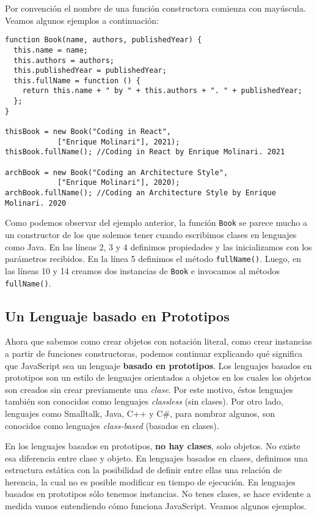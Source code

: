 \documentclass[a4paper, oneside, titlepage, 12pt]{paper}
\begin{document}
Por convención el nombre de una función constructora comienza con mayúscula. Veamos algunos ejemplos a continuación:

\begin{verbatim}
function Book(name, authors, publishedYear) {
  this.name = name;
  this.authors = authors;
  this.publishedYear = publishedYear;
  this.fullName = function () {
    return this.name + " by " + this.authors + ". " + publishedYear;
  };
}

thisBook = new Book("Coding in React", 
			["Enrique Molinari"], 2021);
thisBook.fullName(); //Coding in React by Enrique Molinari. 2021

archBook = new Book("Coding an Architecture Style", 
			["Enrique Molinari"], 2020);
archBook.fullName(); //Coding an Architecture Style by Enrique Molinari. 2020 
\end{verbatim}

Como podemos observar del ejemplo anterior, la función \texttt{Book} se parece mucho a un constructor de los que solemos tener cuando escribimos clases en lenguajes como Java. En las líneas 2, 3 y 4 definimos propiedades y las inicializamos con los parámetros recibidos. En la línea 5 definimos el método \texttt{fullName()}. Luego, en las líneas 10 y 14 creamos dos instancias de \texttt{Book} e invocamos al métodos \texttt{fullName()}. 

\subsection{Un Lenguaje basado en Prototipos}

Ahora que sabemos como crear objetos con notación literal, como crear instancias a partir de funciones constructoras, podemos continuar explicando qué significa que JavaScript sea un lenguaje \textbf{basado en prototipos}. Los lenguajes basados en prototipos son un estilo de lenguajes orientados a objetos en los cuales los objetos son creados sin crear previamente una \textit{clase}. Por este motivo, éstos lenguajes también son conocidos como lenguajes \textit{classless} (sin clases). Por otro lado, lenguajes como Smalltalk, Java, C++ y C\#, para nombrar algunos, son conocidos como lenguajes \textit{class-based} (basados en clases).
\newline

En los lenguajes basados en prototipos, \textbf{no hay clases}, solo objetos. No existe esa diferencia entre clase y objeto. En lenguajes basados en clases, definimos una estructura estática con la posibilidad de definir entre ellas una relación de herencia, la cual no es posible modificar en tiempo de ejecución. En lenguajes basados en prototipos sólo tenemos instancias. No tenes clases, se hace evidente a medida vamos entendiendo cómo funciona JavaScript. Veamos algunos ejemplos.
\newline
\end{document}
